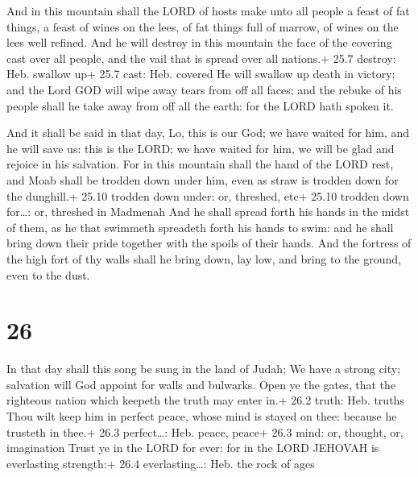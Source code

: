  And in this mountain shall the LORD of hosts make unto
all people a feast of fat things, a feast of wines on the lees, of fat
things full of marrow, of wines on the lees well refined. 
And he will destroy in this mountain the face of the covering cast over
all people, and the vail that is spread over all nations.+ 25.7 destroy:
Heb. swallow up+ 25.7 cast: Heb. covered  He will swallow up
death in victory; and the Lord GOD will wipe away tears from off all
faces; and the rebuke of his people shall he take away from off all the
earth: for the LORD hath spoken it.

 And it shall be said in that day, Lo, this is our God; we
have waited for him, and he will save us: this is the LORD; we have
waited for him, we will be glad and rejoice in his salvation.
 For in this mountain shall the hand of the LORD rest, and
Moab shall be trodden down under him, even as straw is trodden down for
the dunghill.+ 25.10 trodden down under: or, threshed, etc+ 25.10
trodden down for\ldots: or, threshed in Madmenah  And he
shall spread forth his hands in the midst of them, as he that swimmeth
spreadeth forth his hands to swim: and he shall bring down their pride
together with the spoils of their hands.  And the fortress
of the high fort of thy walls shall he bring down, lay low, and bring to
the ground, even to the dust.

\hypertarget{section-25}{%
\section{26}\label{section-25}}

 In that day shall this song be sung in the land of Judah;
We have a strong city; salvation will God appoint for walls and
bulwarks.  Open ye the gates, that the righteous nation
which keepeth the truth may enter in.+ 26.2 truth: Heb. truths
 Thou wilt keep him in perfect peace, whose mind is stayed
on thee: because he trusteth in thee.+ 26.3 perfect\ldots: Heb. peace,
peace+ 26.3 mind: or, thought, or, imagination  Trust ye in
the LORD for ever: for in the LORD JEHOVAH is everlasting strength:+
26.4 everlasting\ldots: Heb. the rock of ages

